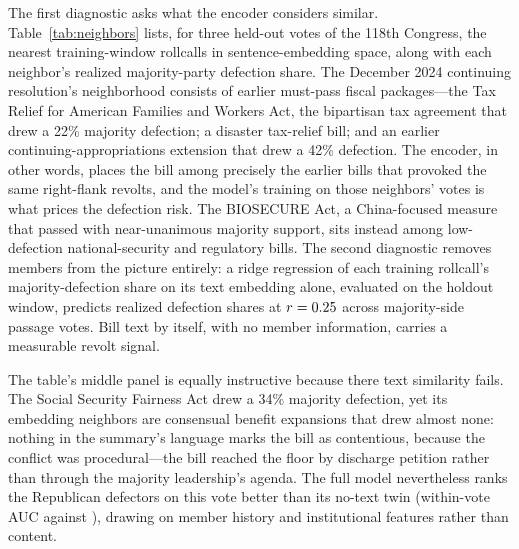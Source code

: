 \documentclass[12pt]{article}
\begin{document}
The first diagnostic asks what the encoder considers similar.
Table~\ref{tab:neighbors} lists, for three held-out votes of the
118th Congress, the nearest training-window rollcalls in
sentence-embedding space, along with each neighbor's realized
majority-party defection share. The December 2024 continuing
resolution's neighborhood consists of earlier must-pass fiscal
packages---the Tax Relief for American Families and Workers Act, the
bipartisan tax agreement that drew a 22\% majority defection; a
disaster tax-relief bill; and an earlier continuing-appropriations
extension that drew a 42\% defection. The encoder, in other words,
places the bill among precisely the earlier bills that provoked the
same right-flank revolts, and the model's training on those
neighbors' votes is what prices the defection risk. The BIOSECURE
Act, a China-focused measure that passed with near-unanimous majority
support, sits instead among low-defection national-security and
regulatory bills. The second diagnostic removes members from the
picture entirely: a ridge regression of each training rollcall's
majority-defection share on its text embedding alone, evaluated on
the holdout window, predicts realized defection shares at
$r = 0.25$ across \revoltProbeN{} majority-side passage
votes. Bill text by itself, with no member information, carries a
measurable revolt signal.

The table's middle panel is equally instructive because there text
similarity fails. The Social Security Fairness Act drew a 34\%
majority defection, yet its embedding neighbors are consensual
benefit expansions that drew almost none: nothing in the summary's
language marks the bill as contentious, because the conflict was
procedural---the bill reached the floor by discharge petition rather
than through the majority leadership's agenda. The full model
nevertheless ranks the \ssfaDefectors{} Republican defectors on this
vote better than its no-text twin (within-vote AUC \ssfaAUCtext{}
against \ssfaAUCnotext), drawing on member history and institutional
features rather than content.
\end{document}
